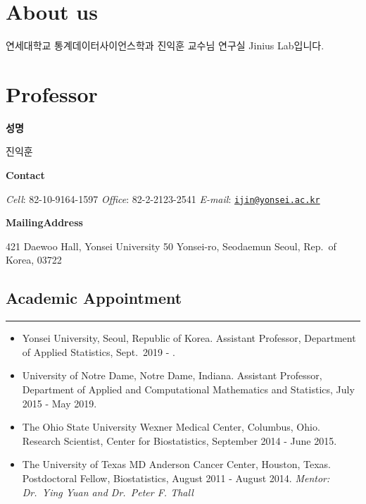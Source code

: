 \documentclass[
]{book}
\author{}
\date{\vspace{-2.5em}}
\begin{document}
{
\setcounter{tocdepth}{1}
\tableofcontents
}
\hypertarget{about-us}{%
\chapter*{About us}\label{about-us}}

연세대학교 통계데이터사이언스학과 진익훈 교수님 연구실 Jinius Lab입니다.

\hypertarget{professor}{%
\chapter*{Professor}\label{professor}}

\textbf{성명}

진익훈

\textbf{Contact}

\emph{Cell}: 82-10-9164-1597
\emph{Office}: 82-2-2123-2541
\emph{E-mail}: \href{mailto:ijin@yonsei.ac.kr}{\nolinkurl{ijin@yonsei.ac.kr}}

\textbf{Mailing}\textbf{Address}

421 Daewoo Hall, Yonsei University
50 Yonsei-ro, Seodaemun
Seoul, Rep.~of Korea, 03722

\hypertarget{academic-appointment}{%
\section*{Academic Appointment}\label{academic-appointment}}

\begin{center}\rule{0.5\linewidth}{0.5pt}\end{center}

\begin{itemize}
\item
  Yonsei University, Seoul, Republic of Korea.
  Assistant Professor, Department of Applied Statistics, Sept.~2019 - .
\item
  University of Notre Dame, Notre Dame, Indiana.
  Assistant Professor, Department of Applied and Computational Mathematics and Statistics, July 2015 - May 2019.
\item
  The Ohio State University Wexner Medical Center, Columbus, Ohio.
  Research Scientist, Center for Biostatistics, September 2014 - June 2015.
\item
  The University of Texas MD Anderson Cancer Center, Houston, Texas.
  Postdoctoral Fellow, Biostatistics, August 2011 - August 2014.
  \emph{Mentor: Dr.~Ying Yuan and Dr.~Peter F. Thall}
\end{itemize}
\end{document}
